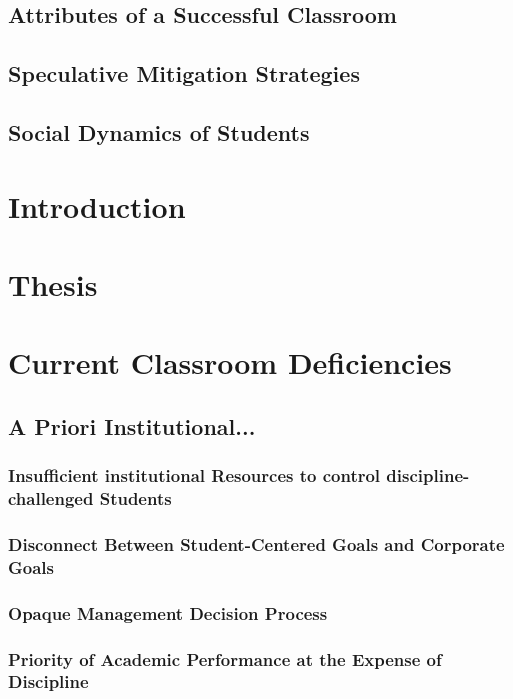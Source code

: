 \documentclass[12pt]{article}
\begin{document}
	\subsection{Attributes of a Successful Classroom}
	\subsection{Speculative Mitigation Strategies}
	\subsection{Social Dynamics of Students}
	
	\section{Introduction}
	
	\section{Thesis}
	
	\section{Current Classroom Deficiencies}
	
	\subsection{A Priori Institutional...}
	\subsubsection{Insufficient institutional Resources to control discipline-challenged Students}
	\subsubsection{Disconnect Between Student-Centered Goals and Corporate Goals}
	\subsubsection{Opaque Management Decision Process}
	\subsubsection{Priority of Academic Performance at the Expense of Discipline}
\end{document}
